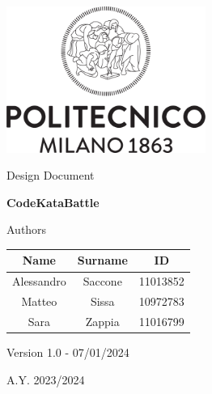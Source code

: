 \documentclass[12pt,a4paper]{article}
\begin{document}
\begin{titlepage}
    \centering
    \includegraphics[width=6.5cm]{Logo_Politecnico_Milano.png} \par
    \vspace*{2.3cm}
    {\LARGE Design Document}\par
   
   
    \vspace*{0.8cm}
    {\Large \textbf{CodeKataBattle}}\par
    \vspace*{6.8cm}
    
    \setlength{\tabcolsep}{1.1cm}
    \large Authors \par
    \begin{table}[h]
      \centering
      
      \renewcommand{\arraystretch}{2} 
      \begin{tabular}{c c c }
        \textbf{Name} & \textbf{Surname} & \textbf{ID} \\
        \hline
        Alessandro & Saccone & 11013852 \\
        
        Matteo & Sissa & 10972783  \\
        
        Sara & Zappia & 11016799\\
        
      \end{tabular}
    \end{table}
    \vspace*{1.3cm}
    \small{ Version 1.0 - 07/01/2024}\par
    \vspace*{0.3cm}
    \small{ A.Y. 2023/2024}\par
\end{titlepage}


\newpage
\tableofcontents






\end{document}
